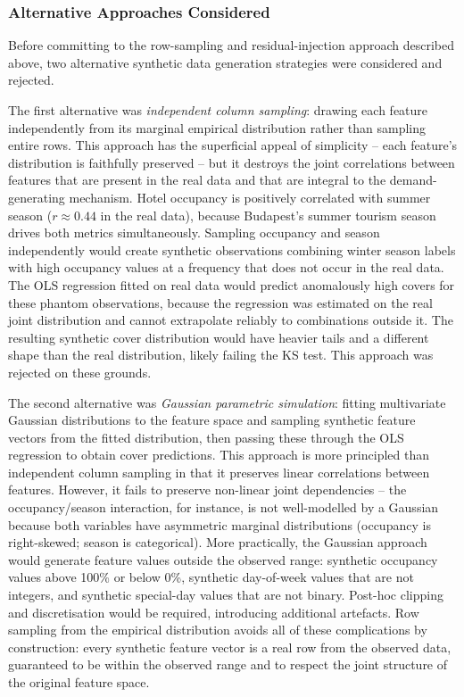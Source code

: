 \documentclass[12pt,a4paper,oneside]{article}
\begin{document}
\subsubsection{Alternative Approaches Considered}

Before committing to the row-sampling and residual-injection approach described above, two alternative synthetic data generation strategies were considered and rejected.

The first alternative was \textit{independent column sampling}: drawing each feature independently from its marginal empirical distribution rather than sampling entire rows. This approach has the superficial appeal of simplicity -- each feature's distribution is faithfully preserved -- but it destroys the joint correlations between features that are present in the real data and that are integral to the demand-generating mechanism. Hotel occupancy is positively correlated with summer season ($r \approx 0.44$ in the real data), because Budapest's summer tourism season drives both metrics simultaneously. Sampling occupancy and season independently would create synthetic observations combining winter season labels with high occupancy values at a frequency that does not occur in the real data. The OLS regression fitted on real data would predict anomalously high covers for these phantom observations, because the regression was estimated on the real joint distribution and cannot extrapolate reliably to combinations outside it. The resulting synthetic cover distribution would have heavier tails and a different shape than the real distribution, likely failing the KS test. This approach was rejected on these grounds.

The second alternative was \textit{Gaussian parametric simulation}: fitting multivariate Gaussian distributions to the feature space and sampling synthetic feature vectors from the fitted distribution, then passing these through the OLS regression to obtain cover predictions. This approach is more principled than independent column sampling in that it preserves linear correlations between features. However, it fails to preserve non-linear joint dependencies -- the occupancy/season interaction, for instance, is not well-modelled by a Gaussian because both variables have asymmetric marginal distributions (occupancy is right-skewed; season is categorical). More practically, the Gaussian approach would generate feature values outside the observed range: synthetic occupancy values above 100\% or below 0\%, synthetic day-of-week values that are not integers, and synthetic special-day values that are not binary. Post-hoc clipping and discretisation would be required, introducing additional artefacts. Row sampling from the empirical distribution avoids all of these complications by construction: every synthetic feature vector is a real row from the observed data, guaranteed to be within the observed range and to respect the joint structure of the original feature space.
\end{document}
